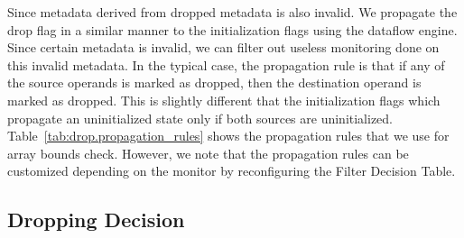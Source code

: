 Since metadata derived from dropped metadata is also invalid. We propagate the
drop flag in a similar manner to the initialization flags using the dataflow
engine. Since certain metadata is invalid, we can filter out useless monitoring
done on this invalid metadata. In the typical case, the propagation rule is
that if any of the source operands is marked as dropped, then the destination
operand is marked as dropped. This is slightly different that the
initialization flags which propagate an uninitialized state only if both
sources are uninitialized. Table~\ref{tab:drop.propagation_rules} shows the
propagation rules that we use for array bounds check.  However, we note that
the propagation rules can be customized depending on the monitor by
reconfiguring the Filter Decision Table.

\subsection{Dropping Decision}

